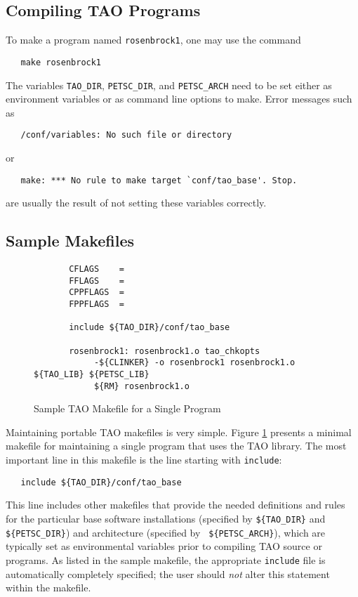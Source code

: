 \subsection{Compiling TAO Programs}

To make a program named \texttt{rosenbrock1}, one may use the command
\begin{verbatim}
   make rosenbrock1
\end{verbatim}
\noindent
The variables \texttt{TAO\_DIR}, \texttt{PETSC\_DIR}, and \texttt{PETSC\_ARCH}
need to be set either as environment variables or as command line options to make. Error messages such as 
\begin{verbatim}
   /conf/variables: No such file or directory
\end{verbatim}
or
\begin{verbatim}
   make: *** No rule to make target `conf/tao_base'. Stop.
\end{verbatim}
are usually the result of not setting these variables correctly.


\subsection{Sample Makefiles}

\begin{figure}[tbh]
{\footnotesize
\begin{verbatim}   
       CFLAGS    = 
       FFLAGS    = 
       CPPFLAGS  =
       FPPFLAGS  =
       
       include ${TAO_DIR}/conf/tao_base
   
       rosenbrock1: rosenbrock1.o tao_chkopts
            -${CLINKER} -o rosenbrock1 rosenbrock1.o ${TAO_LIB} ${PETSC_LIB}
            ${RM} rosenbrock1.o
\end{verbatim} 
}
\caption{Sample TAO Makefile for a Single Program}
\label{fig:make1}
\end{figure}

Maintaining portable TAO makefiles is very simple.  Figure
\ref{fig:make1} presents a minimal makefile for maintaining a single
program that uses the TAO library.  The most important line in this
makefile is the line starting with \texttt{include}:
\begin{verbatim}
   include ${TAO_DIR}/conf/tao_base
\end{verbatim} 
This line  includes other makefiles that provide the
needed definitions and rules for the particular base software
installations (specified by \texttt{\$\{TAO\_DIR\}} and {\tt
  \$\{PETSC\_DIR\}}) and architecture (specified by {\tt
  \$\{PETSC\_ARCH\}}), which are typically set as environmental
variables prior to compiling TAO source or programs.  As listed in the
sample makefile, the appropriate \texttt{include} file is automatically
completely specified; the user should {\em not} alter this statement
within the makefile.

